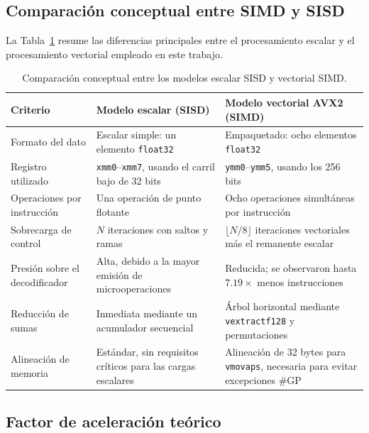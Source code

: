 \documentclass[journal]{IEEEtran}
\begin{document}
\subsection{Comparación conceptual entre SIMD y SISD}

La Tabla~\ref{tab:simd-sisd} resume las diferencias principales entre el
procesamiento escalar y el procesamiento vectorial empleado en este trabajo.

\begin{table}[!t]
  \centering
  \caption{Comparación conceptual entre los modelos escalar SISD y vectorial SIMD.}
  \label{tab:simd-sisd}
  \begin{tabularx}{\textwidth}{@{}>{\raggedright\arraybackslash}p{}
    >{\raggedright\arraybackslash}X >{\raggedright\arraybackslash}X@{}}
    \toprule
    Criterio & Modelo escalar (SISD) & Modelo vectorial AVX2 (SIMD) \\
    \midrule
    Formato del dato & Escalar simple: un elemento \texttt{float32} &
      Empaquetado: ocho elementos \texttt{float32} \\
    Registro utilizado & \texttt{xmm0}--\texttt{xmm7}, usando el carril bajo
      de 32 bits & \texttt{ymm0}--\texttt{ymm5}, usando los 256 bits \\
    Operaciones por instrucción & Una operación de punto flotante &
      Ocho operaciones simultáneas por instrucción \\
    Sobrecarga de control & $N$ iteraciones con saltos y ramas &
      $\lfloor N/8\rfloor$ iteraciones vectoriales más el remanente escalar \\
    Presión sobre el decodificador & Alta, debido a la mayor emisión de
      microoperaciones & Reducida; se observaron hasta $7.19\times$ menos
      instrucciones \\
    Reducción de sumas & Inmediata mediante un acumulador secuencial &
      Árbol horizontal mediante \texttt{vextractf128} y permutaciones \\
    Alineación de memoria & Estándar, sin requisitos críticos para las cargas
      escalares & Alineación de 32 bytes para \texttt{vmovaps}, necesaria para
      evitar excepciones \#GP \\
    \bottomrule
  \end{tabularx}
\end{table}

\subsection{Factor de aceleración teórico}
\end{document}
